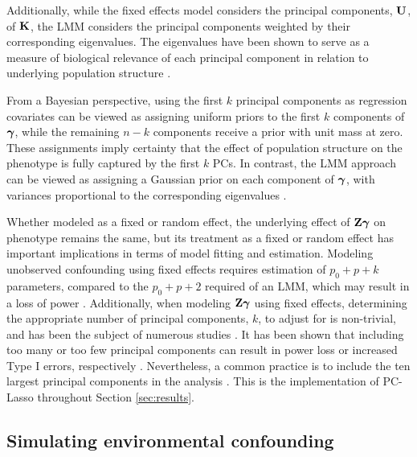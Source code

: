 Additionally, while the fixed effects model considers the principal components, $\textbf{U}$, of $\textbf{K}$, the LMM considers the principal components weighted by their corresponding eigenvalues. The eigenvalues have been shown to serve as a measure of biological relevance of each principal component in relation to underlying population structure \citep{hoffman2013correcting, price2006principal}. 

From a Bayesian perspective, using the first $k$ principal components as regression covariates can be viewed as assigning uniform priors to the first $k$ components of $\boldsymbol{\gamma}$, while the remaining $n - k$ components receive a prior with unit mass at zero. These assignments imply certainty that the effect of population structure on the phenotype is fully captured by the first $k$ PCs. In contrast, the LMM approach can be viewed as assigning a Gaussian prior on each component of $\boldsymbol{\gamma}$, with variances proportional to the corresponding eigenvalues \citep{astle2009population}. 

Whether modeled as a fixed or random effect, the underlying effect of $\textbf{Z} \boldsymbol{\gamma}$ on phenotype remains the same, but its treatment as a fixed or random effect has important implications in terms of model fitting and estimation. Modeling unobserved confounding using fixed effects requires estimation of $p_0 + p + k$ parameters, compared to the $p_0 + p + 2$ required of an LMM, which may result in a loss of power \citep{zhang2015principal}. Additionally, when modeling $\textbf{Z} \boldsymbol{\gamma}$ using fixed effects, determining the appropriate number of principal components, $k$, to adjust for is non-trivial, and has been the subject of numerous studies \citep{patterson2006population, zhao2018practical}. It has been shown that including too many or too few principal components can result in power loss or increased Type I errors, respectively \citep{zhang2015principal}. Nevertheless, a common practice is to include the ten largest principal components in the analysis \citep{zhao2018practical}. This is the implementation of PC-Lasso throughout Section \ref{sec:results}.



\subsection{Simulating environmental confounding}
\label{sec:sim_env_conf}


